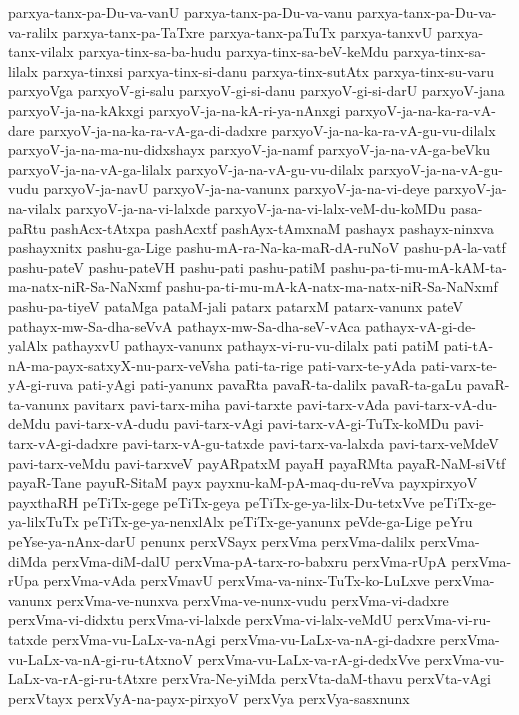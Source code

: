 {parxya-tanx-pa-Du-va-vanU
parxya-tanx-pa-Du-va-vanu
parxya-tanx-pa-Du-va-va-ralilx
parxya-tanx-pa-TaTxre
parxya-tanx-paTuTx
parxya-tanxvU
parxya-tanx-vilalx
parxya-tinx-sa-ba-hudu
parxya-tinx-sa-beV-keMdu
parxya-tinx-sa-lilalx
parxya-tinxsi
parxya-tinx-si-danu
parxya-tinx-sutAtx
parxya-tinx-su-varu
parxyoVga
parxyoV-gi-salu
parxyoV-gi-si-danu
parxyoV-gi-si-darU
parxyoV-jana
parxyoV-ja-na-kAkxgi
parxyoV-ja-na-kA-ri-ya-nAnxgi
parxyoV-ja-na-ka-ra-vA-dare
parxyoV-ja-na-ka-ra-vA-ga-di-dadxre
parxyoV-ja-na-ka-ra-vA-gu-vu-dilalx
parxyoV-ja-na-ma-nu-didxshayx
parxyoV-ja-namf
parxyoV-ja-na-vA-ga-beVku
parxyoV-ja-na-vA-ga-lilalx
parxyoV-ja-na-vA-gu-vu-dilalx
parxyoV-ja-na-vA-gu-vudu
parxyoV-ja-navU
parxyoV-ja-na-vanunx
parxyoV-ja-na-vi-deye
parxyoV-ja-na-vilalx
parxyoV-ja-na-vi-lalxde
parxyoV-ja-na-vi-lalx-veM-du-koMDu
pasa-paRtu
pashAcx-tAtxpa
pashAcxtf
pashAyx-tAmxnaM
pashayx
pashayx-ninxva
pashayxnitx
pashu-ga-Lige
pashu-mA-ra-Na-ka-maR-dA-ruNoV
pashu-pA-la-vatf
pashu-pateV
pashu-pateVH
pashu-pati
pashu-patiM
pashu-pa-ti-mu-mA-kAM-ta-ma-natx-niR-Sa-NaNxmf
pashu-pa-ti-mu-mA-kA-natx-ma-natx-niR-Sa-NaNxmf
pashu-pa-tiyeV
pataMga
pataM-jali
patarx
patarxM
patarx-vanunx
pateV
pathayx-mw-Sa-dha-seVvA
pathayx-mw-Sa-dha-seV-vAca
pathayx-vA-gi-de-yalAlx
pathayxvU
pathayx-vanunx
pathayx-vi-ru-vu-dilalx
pati
patiM
pati-tA-nA-ma-payx-satxyX-nu-parx-veVsha
pati-ta-rige
pati-varx-te-yAda
pati-varx-te-yA-gi-ruva
pati-yAgi
pati-yanunx
pavaRta
pavaR-ta-dalilx
pavaR-ta-gaLu
pavaR-ta-vanunx
pavitarx
pavi-tarx-miha
pavi-tarxte
pavi-tarx-vAda
pavi-tarx-vA-du-deMdu
pavi-tarx-vA-dudu
pavi-tarx-vAgi
pavi-tarx-vA-gi-TuTx-koMDu
pavi-tarx-vA-gi-dadxre
pavi-tarx-vA-gu-tatxde
pavi-tarx-va-lalxda
pavi-tarx-veMdeV
pavi-tarx-veMdu
pavi-tarxveV
payARpatxM
payaH
payaRMta
payaR-NaM-siVtf
payaR-Tane
payuR-SitaM
payx
payxnu-kaM-pA-maq-du-reVva
payxpirxyoV
payxthaRH
peTiTx-gege
peTiTx-geya
peTiTx-ge-ya-lilx-Du-tetxVve
peTiTx-ge-ya-lilxTuTx
peTiTx-ge-ya-nenxlAlx
peTiTx-ge-yanunx
peVde-ga-Lige
peYru
peYse-ya-nAnx-darU
penunx
perxVSayx
perxVma
perxVma-dalilx
perxVma-diMda
perxVma-diM-dalU
perxVma-pA-tarx-ro-babxru
perxVma-rUpA
perxVma-rUpa
perxVma-vAda
perxVmavU
perxVma-va-ninx-TuTx-ko-LuLxve
perxVma-vanunx
perxVma-ve-nunxva
perxVma-ve-nunx-vudu
perxVma-vi-dadxre
perxVma-vi-didxtu
perxVma-vi-lalxde
perxVma-vi-lalx-veMdU
perxVma-vi-ru-tatxde
perxVma-vu-LaLx-va-nAgi
perxVma-vu-LaLx-va-nA-gi-dadxre
perxVma-vu-LaLx-va-nA-gi-ru-tAtxnoV
perxVma-vu-LaLx-va-rA-gi-dedxVve
perxVma-vu-LaLx-va-rA-gi-ru-tAtxre
perxVra-Ne-yiMda
perxVta-daM-thavu
perxVta-vAgi
perxVtayx
perxVyA-na-payx-pirxyoV
perxVya
perxVya-sasxnunx
}
